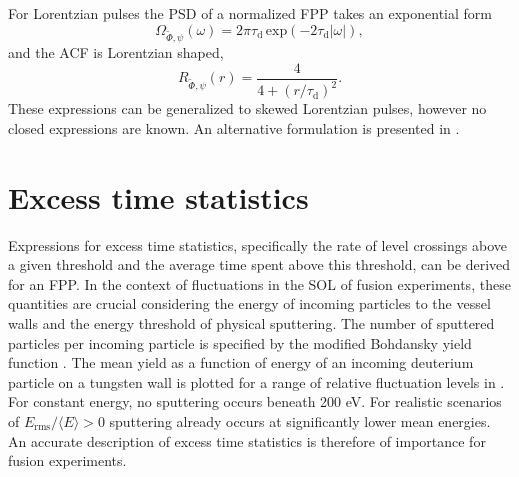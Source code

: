 For Lorentzian pulses the PSD of a normalized FPP takes an exponential form \cite{garcia2018skewed}
\begin{equation}
	\Omega_{\widetilde{\Phi},\psi}(\omega) = 2\pi\tau_\mathrm{d}\, \mathrm{exp}\left(-2\tau_\mathrm{d}|\omega|\right),
\end{equation}
and the ACF is Lorentzian shaped,
\begin{equation}
	R_{\widetilde{\Phi},\psi}(r) = \frac{4}{4+(r/\tau_\mathrm{d})^2}.
\end{equation}
These expressions can be generalized to skewed Lorentzian pulses, however no closed expressions are known. An alternative formulation is presented in \cite{garcia2018skewed}.

\section{Excess time statistics}
Expressions for excess time statistics, specifically the rate of level crossings above a given threshold and the average time spent above this threshold, can be derived for an FPP. In the context of fluctuations in the SOL of fusion experiments, these quantities are crucial considering the energy of incoming particles to the vessel walls and the energy threshold of physical sputtering. The number of sputtered particles per incoming particle is specified by the modified Bohdansky yield function \cite{marandet2016assessment}. The mean yield as a function of energy of an incoming deuterium particle on a tungsten wall is plotted for a range of relative fluctuation levels in . For constant energy, no sputtering occurs beneath 200 eV. For realistic scenarios of $E_\mathrm{rms}/\langle E\rangle > 0$ sputtering already occurs at significantly lower mean energies. An accurate description of excess time statistics is therefore of importance for fusion experiments. 

